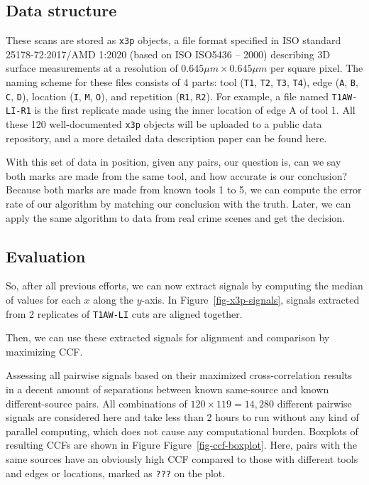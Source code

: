 \documentclass[
  authoryear,
  preprint,
  5p,
  twocolumn]{elsarticle}
\begin{document}
\subsection{Data structure}\label{sec-Datastructure}

These scans are stored as \texttt{x3p} objects, a file format specified
in ISO standard 25178-72:2017/AMD 1:2020 (based on ISO ISO5436 -- 2000)
describing 3D surface measurements at a resolution of
\(0.645 \mu m \times 0.645 \mu m\) per square pixel. The naming scheme
for these files consists of 4 parts: tool (\texttt{T1}, \texttt{T2},
\texttt{T3}, \texttt{T4}), edge (\texttt{A}, \texttt{B}, \texttt{C},
\texttt{D}), location (\texttt{I}, \texttt{M}, \texttt{O}), and
repetition (\texttt{R1}, \texttt{R2}). For example, a file named
\texttt{T1AW-LI-R1} is the first replicate made using the inner location
of edge A of tool 1. All these 120 well-documented \texttt{x3p} objects
will be uploaded to a public data repository, and a more detailed data
description paper can be found here.

With this set of data in position, given any pairs, our question is, can
we say both marks are made from the same tool, and how accurate is our
conclusion? Because both marks are made from known tools 1 to 5, we can
compute the error rate of our algorithm by matching our conclusion with
the truth. Later, we can apply the same algorithm to data from real
crime scenes and get the decision.

\subsection{Evaluation}\label{evaluation}

So, after all previous efforts, we can now extract signals by computing
the median of values for each \(x\) along the \(y\)-axis. In
Figure~\ref{fig-x3p-signals}, signals extracted from 2 replicates of
\texttt{T1AW-LI} cuts are aligned together.

Then, we can use these extracted signals for alignment and comparison by
maximizing CCF.

Assessing all pairwise signals based on their maximized
cross-correlation results in a decent amount of separations between
known same-source and known different-source pairs. All combinations of
\(120 \times 119 = 14,280\) different pairwise signals are considered
here and take less than 2 hours to run without any kind of parallel
computing, which does not cause any computational burden. Boxplots of
resulting CCFs are shown in Figure Figure~\ref{fig-ccf-boxplot}. Here,
pairs with the same sources have an obviously high CCF compared to those
with different tools and edges or locations, marked as \texttt{???} on
the plot.
\end{document}
